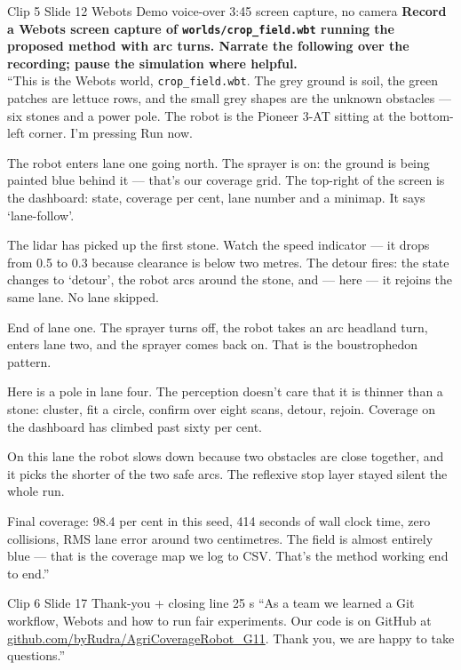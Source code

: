 \documentclass[11pt,a4paper]{article}
\begin{document}
\begin{clipbox}{Clip 5 \textbullet{} Slide 12 Webots Demo voice-over \textbullet{} 3:45 \textbullet{} screen capture, no camera}
\textbf{Record a Webots screen capture of \texttt{worlds/crop\_field.wbt} running the proposed method with arc turns. Narrate the following over the recording; pause the simulation where helpful.}\\[4pt]

``This is the Webots world, \texttt{crop\_field.wbt}. The grey ground is soil, the green patches are lettuce rows, and the small grey shapes are the unknown obstacles --- six stones and a power pole. The robot is the Pioneer 3-AT sitting at the bottom-left corner. I'm pressing Run now.

The robot enters lane one going north. The sprayer is on: the ground is being painted blue behind it --- that's our coverage grid. The top-right of the screen is the dashboard: state, coverage per cent, lane number and a minimap. It says `lane-follow'.

The lidar has picked up the first stone. Watch the speed indicator --- it drops from 0.5 to 0.3 because clearance is below two metres. The detour fires: the state changes to `detour', the robot arcs around the stone, and --- here --- it rejoins the same lane. No lane skipped.

End of lane one. The sprayer turns off, the robot takes an arc headland turn, enters lane two, and the sprayer comes back on. That is the boustrophedon pattern.

Here is a pole in lane four. The perception doesn't care that it is thinner than a stone: cluster, fit a circle, confirm over eight scans, detour, rejoin. Coverage on the dashboard has climbed past sixty per cent.

On this lane the robot slows down because two obstacles are close together, and it picks the shorter of the two safe arcs. The reflexive stop layer stayed silent the whole run.

Final coverage: 98.4 per cent in this seed, 414 seconds of wall clock time, zero collisions, RMS lane error around two centimetres. The field is almost entirely blue --- that is the coverage map we log to CSV. That's the method working end to end.''
\end{clipbox}

\begin{clipbox}{Clip 6 \textbullet{} Slide 17 Thank-you + closing line \textbullet{} 25 s}
``As a team we learned a Git workflow, Webots and how to run fair experiments. Our code is on GitHub at \url{github.com/byRudra/AgriCoverageRobot_G11}. Thank you, we are happy to take questions.''
\end{clipbox}
\end{document}
